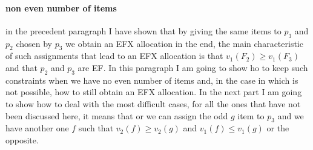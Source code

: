 \documentclass{article}
\begin{document}
\paragraph{non even number of items} in the precedent paragraph I have shown that by giving the same items to $p_3$ and $p_2$ chosen by $p_3$ we obtain an EFX allocation in the end, the main characteristic of such assignments that lead to an EFX allocation is that $v_1(F_2) \ge v_1(F_3)$ and that $p_2$ and $p_3$ are EF. In this paragraph I am going to show ho to keep such constraints when we have no even number of items and, in the case in which is not possible, how to still obtain an EFX allocation. In the next part I am going to show how to deal with the most difficult cases, for all the ones that have not been discussed here, it means that or we can assign the odd $g$ item to $p_3$ and we have another one $f$ such that $v_2(f)\ge v_2(g)$ and $v_1(f) \le v_1(g)$ or the opposite.
\end{document}

